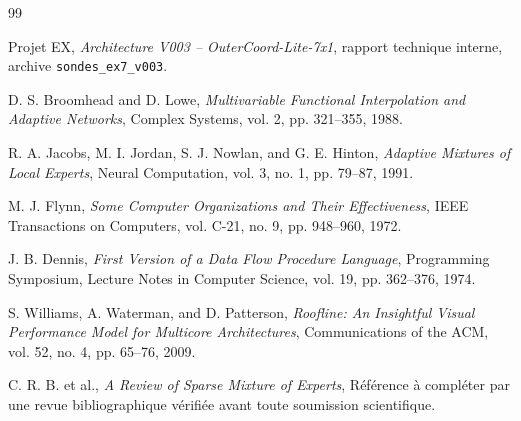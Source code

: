 \documentclass[11pt,a4paper]{article}
\begin{document}
\begin{thebibliography}{99}

Projet EX,
\textit{Architecture V003 -- OuterCoord-Lite-7x1},
rapport technique interne, archive
\texttt{sondes\_ex7\_v003}.

D. S. Broomhead and D. Lowe,
\textit{Multivariable Functional Interpolation and Adaptive Networks},
Complex Systems, vol. 2, pp. 321--355, 1988.

R. A. Jacobs, M. I. Jordan, S. J. Nowlan, and G. E. Hinton,
\textit{Adaptive Mixtures of Local Experts},
Neural Computation, vol. 3, no. 1, pp. 79--87, 1991.

M. J. Flynn,
\textit{Some Computer Organizations and Their Effectiveness},
IEEE Transactions on Computers, vol. C-21, no. 9,
pp. 948--960, 1972.

J. B. Dennis,
\textit{First Version of a Data Flow Procedure Language},
Programming Symposium, Lecture Notes in Computer Science,
vol. 19, pp. 362--376, 1974.

S. Williams, A. Waterman, and D. Patterson,
\textit{Roofline: An Insightful Visual Performance Model for
Multicore Architectures},
Communications of the ACM, vol. 52, no. 4, pp. 65--76, 2009.

C. R. B. et al.,
\textit{A Review of Sparse Mixture of Experts},
Référence à compléter par une revue bibliographique vérifiée
avant toute soumission scientifique.

\end{thebibliography}
\end{document}
